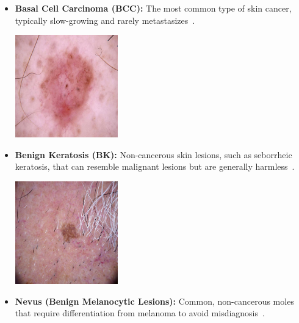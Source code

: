 \documentclass[a4paper,12pt]{report}
\begin{document}
\begin{spacing}{1.5}
\begin{itemize}
        \item \textbf{Basal Cell Carcinoma (BCC):} The most common type of skin cancer, typically slow-growing and rarely metastasizes~\cite{dl12,dl13}.
        
        \begin{center}
            \includegraphics[width=0.35\textwidth]{Pics/cancer/bcc.jpg}
        \end{center}

        \item \textbf{Benign Keratosis (BK):} Non-cancerous skin lesions, such as seborrheic keratosis, that can resemble malignant lesions but are generally harmless~\cite{dl14}.
        
        \begin{center}
            \includegraphics[width=0.35\textwidth]{Pics/cancer/bk.jpg}
        \end{center}

        \item \textbf{Nevus (Benign Melanocytic Lesions):} Common, non-cancerous moles that require differentiation from melanoma to avoid misdiagnosis~\cite{dl14,dl15}.
        

\end{itemize}
\end{spacing}
\end{document}
